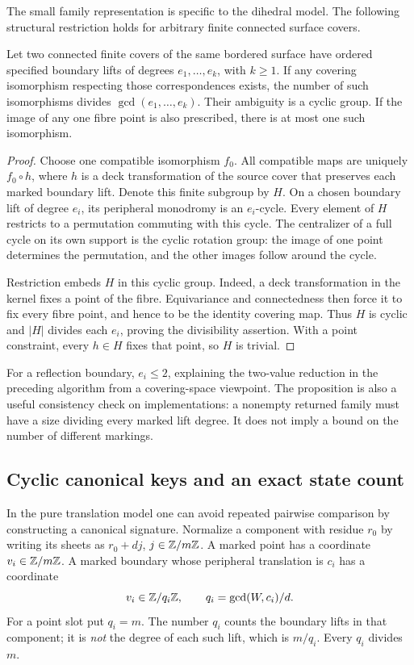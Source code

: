 The small family representation is specific to the dihedral model.  The
following structural restriction holds for arbitrary finite connected
surface covers.

\begin{proposition}\label{prop:bt-ambiguity}
Let two connected finite covers of the same bordered surface have ordered
specified boundary lifts of degrees $e_1,\ldots,e_k$, with $k\ge1$.
If any covering isomorphism respecting those correspondences exists,
the number of such isomorphisms divides $\gcd(e_1,\ldots,e_k)$.  Their
ambiguity is a cyclic group.  If the image of any one fibre point is also
prescribed, there is at most one such isomorphism.
\end{proposition}
\begin{proof}
Choose one compatible isomorphism $f_0$.  All compatible maps are uniquely
$f_0\circ h$, where $h$ is a deck transformation of the source cover that
preserves each marked boundary lift.  Denote this finite subgroup by $H$.
On a chosen boundary lift of degree $e_i$, its peripheral monodromy is an
$e_i$-cycle.  Every element of $H$ restricts to a permutation commuting
with this cycle.  The centralizer of a full cycle on its own support is
the cyclic rotation group: the image of one point determines the
permutation, and the other images follow around the cycle.

Restriction embeds $H$ in this cyclic group.  Indeed, a deck
transformation in the kernel fixes a point of the fibre.  Equivariance
and connectedness then force it to fix every fibre point, and hence to
be the identity covering map.  Thus $H$ is cyclic and $|H|$ divides each
$e_i$, proving the divisibility assertion.  With a point constraint,
every $h\in H$ fixes that point, so $H$ is trivial.
\end{proof}

For a reflection boundary, $e_i\le2$, explaining the two-value reduction
in the preceding algorithm from a covering-space viewpoint.  The
proposition is also a useful consistency check on implementations: a
nonempty returned family must have a size dividing every marked lift
degree.  It does not imply a bound on the number of different markings.

\subsection{Cyclic canonical keys and an exact state count}

In the pure translation model one can avoid repeated pairwise comparison
by constructing a canonical signature.  Normalize a component with residue
$r_0$ by writing its sheets as $r_0+dj$, $j\in\mathbb Z/m\mathbb Z$.  A marked point
has a coordinate $v_i\in\mathbb Z/m\mathbb Z$.  A marked boundary whose peripheral
translation is $c_i$ has a coordinate
\[
 v_i\in\mathbb Z/q_i\mathbb Z,\qquad q_i=\gcd(W,c_i)/d.
\]
For a point slot put $q_i=m$.  The number $q_i$ counts the boundary lifts
in that component; it is \emph{not} the degree of each such lift, which
is $m/q_i$.  Every $q_i$ divides $m$.


